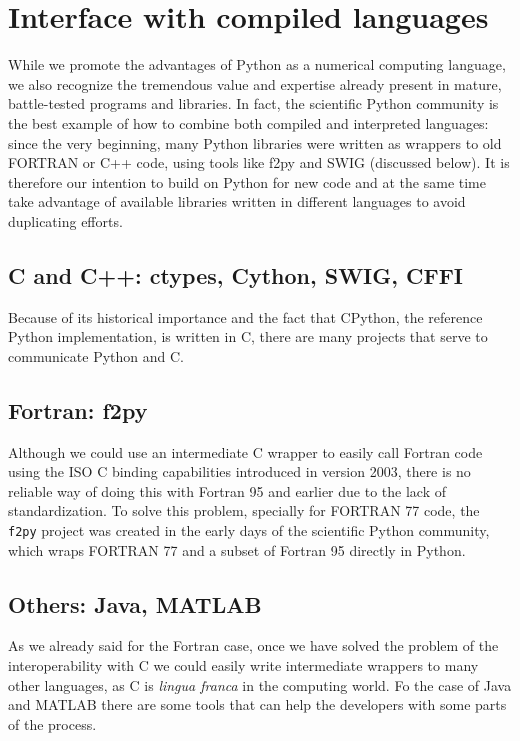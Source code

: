 \section{Interface with compiled languages}
\label{sec:interface}

While we promote the advantages of Python as a numerical computing language, we also recognize the tremendous value and expertise already present in mature, battle-tested programs and libraries. In fact, the scientific Python community is the best example of how to combine both compiled and interpreted languages: since the very beginning, many Python libraries were written as wrappers to old FORTRAN or C++ code, using tools like f2py and SWIG (discussed below)\cite{Millman_2011}. It is therefore our intention to build on Python for new code and at the same time take advantage of available libraries written in different languages to avoid duplicating efforts.

\subsection{C and C++: ctypes, Cython, SWIG, CFFI}

Because of its historical importance and the fact that CPython, the reference Python implementation, is written in C, there are many projects that serve to communicate Python and C.

\subsection{Fortran: f2py}

Although we could use an intermediate C wrapper to easily call Fortran code using the ISO C binding capabilities introduced in version 2003, there is no reliable way of doing this with Fortran 95 and earlier due to the lack of standardization. To solve this problem, specially for FORTRAN 77 code, the \verb|f2py| project was created in the early days of the scientific Python community, which wraps FORTRAN 77 and a subset of Fortran 95 directly in Python\cite{peterson2009f2py}.

\subsection{Others: Java, MATLAB}

As we already said for the Fortran case, once we have solved the problem of the interoperability with C we could easily write intermediate wrappers to many other languages, as C is \textit{lingua franca} in the computing world. Fo the case of Java and MATLAB there are some tools that can help the developers with some parts of the process.

